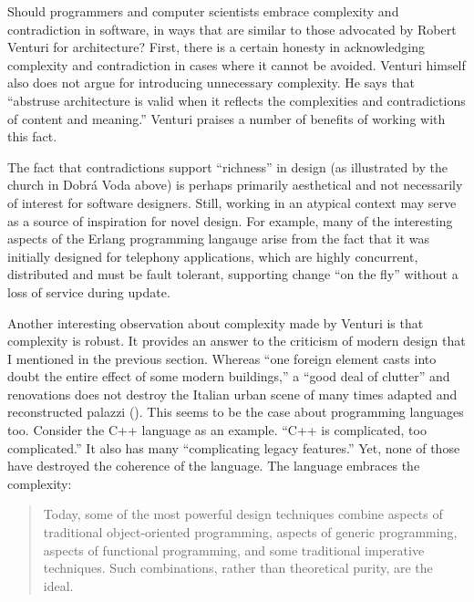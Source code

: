 Should programmers and computer scientists embrace complexity and contradiction in software,
in ways that are similar to those advocated by Robert Venturi for architecture? First, there
is a certain honesty in acknowledging complexity and contradiction in cases where it cannot
be avoided. Venturi himself also does not argue for introducing unnecessary complexity. He says
that ``abstruse architecture is valid when it reflects the complexities and contradictions of
content and meaning.'' Venturi praises a number of benefits
of working with this fact.

The fact that contradictions support ``richness'' in design (as illustrated by the church in
Dobrá Voda above) is perhaps primarily aesthetical and not necessarily of interest for software
designers. Still, working in an atypical context may serve as a source of inspiration for novel
design. For example, many of the interesting aspects of the Erlang programming langauge arise
from the fact that it was initially designed for telephony applications, which are highly
concurrent, distributed and must be fault tolerant, supporting change ``on the fly'' without
a loss of service during update.

Another interesting observation about complexity made by Venturi is that complexity is robust.
It provides an answer to the criticism of modern design that I mentioned in the previous section.
Whereas ``one foreign element casts into doubt the entire effect of some modern
buildings,'' a ``good deal of clutter'' and renovations does not destroy the
Italian urban scene of many times adapted and reconstructed palazzi ().
This seems to be the case about programming languages too. Consider the C++ language as an
example. ``C++ is complicated, too complicated.''
It also has many ``complicating legacy features.''
Yet, none of those have destroyed the coherence of the language. The language embraces the complexity:

\begin{quote}
Today, some of the most powerful design techniques combine aspects of traditional object-oriented
programming, aspects of generic programming, aspects of functional programming, and some
traditional imperative techniques. Such combinations, rather than theoretical purity, are the
ideal.
\end{quote}

